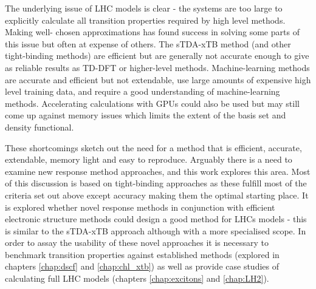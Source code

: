 The underlying issue of LHC models is clear - the systems are too large to explicitly
calculate all transition properties required by high level methods. Making well- 
chosen approximations has found success in solving some parts of this issue but 
often at expense of others. The sTDA-xTB method (and other tight-binding methods) 
are efficient but are generally not accurate enough to give as reliable results 
as TD-DFT or higher-level methods. Machine-learning methods are accurate and efficient
but not extendable, use large amounts of expensive high level training data, and
require a good understanding of machine-learning methods. Accelerating calculations 
with GPUs could also be used but may still come up against memory issues which limits 
the extent of the basis set and density functional.

These shortcomings sketch out the need for a method that is efficient, accurate,
extendable, memory light and easy to reproduce. Arguably there is a need to examine
new response method approaches, and this work explores this area. Most of this discussion
is based on tight-binding approaches as these fulfill most of the criteria set out
above except accuracy making them the optimal starting place. It is explored whether
novel response methods in conjunction with efficient electronic structure methods
could design a good method for LHCs models - this is similar to the sTDA-xTB approach
although with a more specialised scope. In order to assay the usability of these
novel approaches it is necessary to benchmark transition properties against established 
methods (explored in chapters \ref{chap:dscf} and \ref{chap:chl_xtb}) as well as
provide case studies of calculating full LHC models (chapters \ref{chap:excitons} 
and \ref{chap:LH2}).